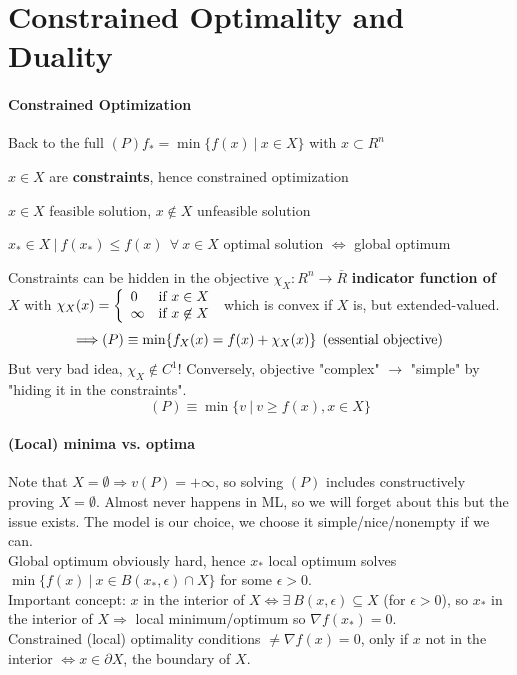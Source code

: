 \documentclass[10pt]{report}
\begin{document}
\section{Constrained Optimality and Duality}
\paragraph{Constrained Optimization} Back to the full $(P) f_* = \min\{f(x)\:|\:x\in X\}$ with $x\subset R^n$\begin{list}{}{}
	\item $x\in X$ are \textbf{constraints}, hence constrained optimization
	\item $x\in X$ feasible solution, $x\not\in X$ unfeasible solution
	\item $x_*\in X\:|\:f(x_*)\leq f(x)\:\:\forall\:x\in X$ optimal solution $\Leftrightarrow$ global optimum
\end{list}
Constraints can be hidden in the objective $\chi_X : R^n\rightarrow \overline{R}$ \textbf{indicator function of $X$} with $\chi_X(x)=\left\{\begin{array}{l l}
0&\hbox{if }x\in X\\
\infty&\hbox{if }x\not\in X
\end{array}\right.$ which is convex if $X$ is, but extended-valued.
$$\Longrightarrow (P)\equiv \min\{f_X(x)=f(x)+\chi_X(x)\}\:\:\hbox{(essential objective)}$$ But very bad idea, $\chi_X\not\in C^1$! Conversely, objective "complex" $\rightarrow$ "simple" by "hiding it in the constraints".
$$(P)\equiv\min\{v\:|\:v\geq f(x), x\in X\}$$
\paragraph{(Local) minima vs. optima} Note that $X=\emptyset\Rightarrow v(P) = +\infty$, so solving $(P)$ includes constructively proving $X=\emptyset$. Almost never happens in ML, so we will forget about this but the issue exists. The model is our choice, we choose it simple/nice/nonempty if we can.\\
Global optimum obviously hard, hence $x_*$ local optimum solves $\min\{f(x)\:|\:x\in B(x_*,\epsilon)\cap X\}$ for some $\epsilon>0$.\\
Important concept: $x$ in the interior of $X\Leftrightarrow\exists\:B(x,\epsilon)\subseteq X$ (for $\epsilon>0$), so $x_*$ in the interior of $X\Rightarrow$ local minimum/optimum so $\nabla f(x_*)=0$.\\
Constrained (local) optimality conditions $\neq\nabla f(x)=0$, only if $x$ not in the interior $\Leftrightarrow x\in \partial X$, the boundary of $X$.
\end{document}
